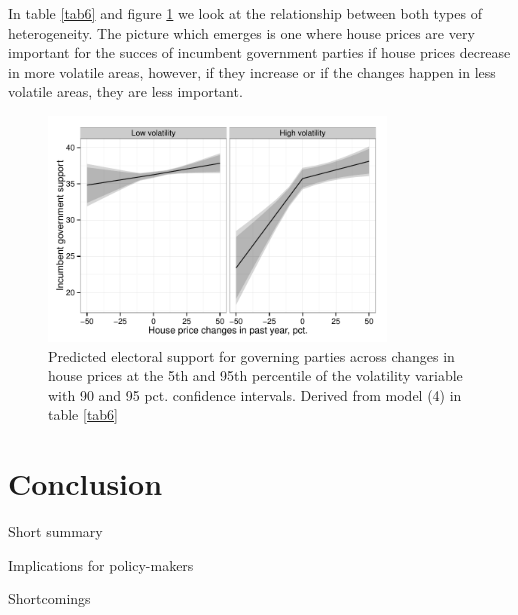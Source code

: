 \documentclass[12pt,a4paper]{article}
\begin{document}
In table \ref{tab6} and figure \ref{volaposneg} we look at the relationship between both types of heterogeneity. The picture which emerges is one where house prices are very important for the succes of incumbent government parties if house prices decrease in more volatile areas, however, if they increase or if the changes happen in less volatile areas, they are less important.



\begin{figure}[htbp]
	\includegraphics[width=0.8\textwidth]{../figures/volaposnegplot}
	\centering
	\caption{Predicted electoral support for governing parties across changes in house prices at the 5th and 95th percentile of the volatility variable with 90 and 95 pct. confidence intervals. Derived from model (4) in table \ref{tab6}}
	\label{volaposneg}
\end{figure}




\section{Conclusion}
Short summary

Implications for policy-makers

Shortcomings









\clearpage

\singlespacing



\end{document}
